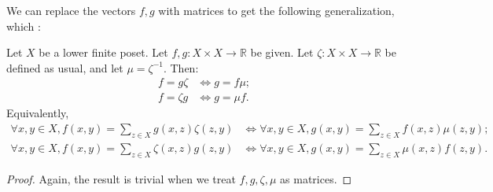 \documentclass[12pt]{pom_thesis}
\newcommand{\Rr}{\mathbb{R}}
\begin{document}
We can replace the vectors $f,g$ with matrices to get the following generalization, which :
\begin{thm}\label{mob_inv_old}
Let $X$ be a lower finite poset.  Let $f,g:X \times X \rightarrow \Rr$ be given. Let $\zeta:X \times X \rightarrow \Rr$ be defined as usual, and let $\mu = \zeta^{-1}$. Then:
\begin{align*}
f = g \zeta &\iff g = f \mu;\\
f = \zeta g &\iff g = \mu f.
\end{align*}
Equivalently,
\begin{align*}
\forall x,y \in X, f(x,y) = \sum_{z \in X}g(x,z)\zeta(z,y) &\iff \forall x,y \in X, g(x,y) = \sum_{z \in X}f(x,z)\mu(z,y);\\
\forall x,y \in X, f(x,y) = \sum_{z \in X}\zeta(x,z)g(z,y) &\iff \forall x,y \in X, g(x,y) = \sum_{z \in X}\mu(x,z)f(z,y).
\end{align*}
\begin{proof}
Again, the result is trivial when we treat $f,g,\zeta,\mu$ as matrices.
\end{proof}
\end{thm}
\end{document}
